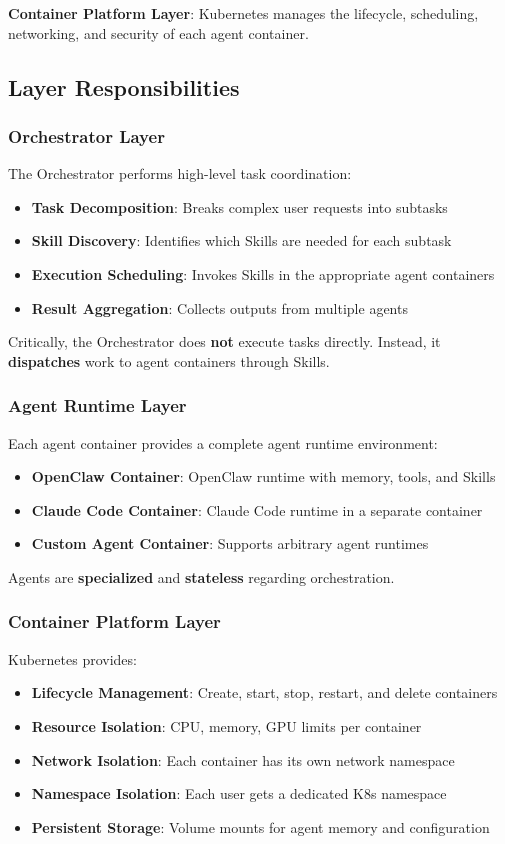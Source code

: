 \textbf{Container Platform Layer}: Kubernetes manages the lifecycle, scheduling, networking, and security of each agent container.

\subsection{Layer Responsibilities}

\subsubsection{Orchestrator Layer}
The Orchestrator performs high-level task coordination:
\begin{itemize}
    \item \textbf{Task Decomposition}: Breaks complex user requests into subtasks
    \item \textbf{Skill Discovery}: Identifies which Skills are needed for each subtask
    \item \textbf{Execution Scheduling}: Invokes Skills in the appropriate agent containers
    \item \textbf{Result Aggregation}: Collects outputs from multiple agents
\end{itemize}

Critically, the Orchestrator does \textbf{not} execute tasks directly. Instead, it \textbf{dispatches} work to agent containers through Skills.

\subsubsection{Agent Runtime Layer}
Each agent container provides a complete agent runtime environment:
\begin{itemize}
    \item \textbf{OpenClaw Container}: OpenClaw runtime with memory, tools, and Skills
    \item \textbf{Claude Code Container}: Claude Code runtime in a separate container
    \item \textbf{Custom Agent Container}: Supports arbitrary agent runtimes
\end{itemize}

Agents are \textbf{specialized} and \textbf{stateless} regarding orchestration.

\subsubsection{Container Platform Layer}
Kubernetes provides:
\begin{itemize}
    \item \textbf{Lifecycle Management}: Create, start, stop, restart, and delete containers
    \item \textbf{Resource Isolation}: CPU, memory, GPU limits per container
    \item \textbf{Network Isolation}: Each container has its own network namespace
    \item \textbf{Namespace Isolation}: Each user gets a dedicated K8s namespace
    \item \textbf{Persistent Storage}: Volume mounts for agent memory and configuration
\end{itemize}

